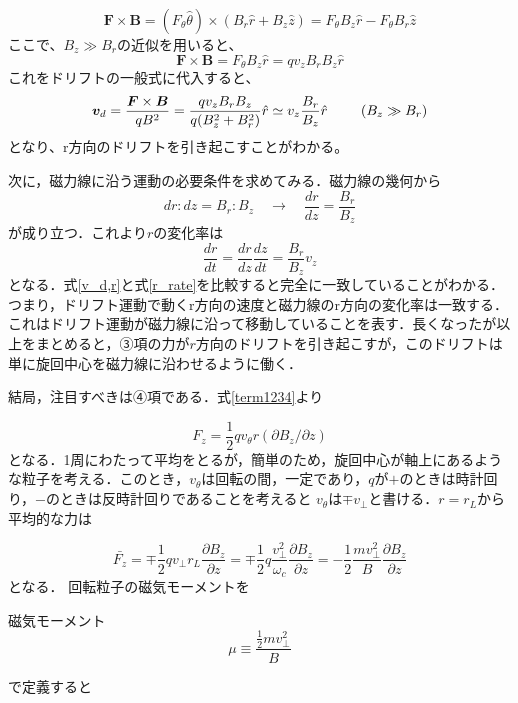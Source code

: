 \documentclass{ltjsarticle}
\numberwithin{equation}{section} %
\numberwithin{equation}{section}
\begin{document}
\[
  \bm{F} \times \bm{B} = (F_\theta \hat{\theta}) \times (B_r \hat{r}+B_z \hat{z}) = F_\theta B_z \hat{r} - F_\theta B_r \hat{z}
\]
ここで、$B_z \gg B_r$の近似を用いると、
\[
 \bm{F} \times \bm{B} = F_\theta B_z \hat{r} = qv_zB_rB_z\hat{r}
\]
これをドリフトの一般式に代入すると、
\begin{equation}
  \bm{v}_{d} = \frac{\bm{F} \times \bm{B}}{qB^2} = \frac{qv_zB_rB_z}{q(B_z^2+B_r^2)}\hat{r} \simeq v_z \frac{B_r}{B_z}\hat{r} \hspace{2pc} (B_z \gg B_r) \label{v_d,r}
\end{equation}
となり、r方向のドリフトを引き起こすことがわかる。

次に，磁力線に沿う運動の必要条件を求めてみる．磁力線の幾何から
\[
  dr:dz=B_r:B_z \quad \to \quad \frac{dr}{dz} = \frac{B_r}{B_z} 
\]
が成り立つ．これより$r$の変化率は
\begin{equation}
  \frac{dr}{dt} = \frac{dr}{dz}\frac{dz}{dt} = \frac{B_r}{B_z}v_z \label{r_rate}
\end{equation}
となる．式\eqref{v_d,r}と式\eqref{r_rate}を比較すると完全に一致していることがわかる．つまり，ドリフト運動で動くr方向の速度と磁力線のr方向の変化率は一致する．
これはドリフト運動が磁力線に沿って移動していることを表す．長くなったが以上をまとめると，➂項の力が$r$方向のドリフトを引き起こすが，このドリフトは単に旋回中心を磁力線に沿わせるように働く．

結局，注目すべきは➃項である．式\eqref{term1234}より

\begin{equation}
  F_z = \frac{1}{2}qv_\theta r(\partial B_z/\partial z)
\end{equation}
となる．1周にわたって平均をとるが，簡単のため，旋回中心が軸上にあるような粒子を考える．このとき，$v_\theta$は回転の間，一定であり，$q$が$+$のときは時計回り，$-$のときは反時計回りであることを考えると
$v_\theta$は$\mp v_\perp$と書ける．$r=r_L$から平均的な力は

\begin{equation}
  \bar{F_z} = \mp \frac{1}{2}qv_\perp r_L\frac{\partial B_z}{\partial z} = \mp \frac{1}{2}q\frac{v_\perp ^2}{\omega_c}\frac{\partial B_z}{\partial z} = -\frac{1}{2}\frac{mv_\perp ^2}{B}\frac{\partial B_z}{\partial z}
\end{equation}
となる．
回転粒子の磁気モーメントを
\begin{eqbox}{磁気モーメント}
\begin{equation}
 \mu \equiv \dfrac{\frac{1}{2}mv_\perp ^2 }{B}  \label{df.mag_moment}
\end{equation}
\end{eqbox}
で定義すると
\end{document}
